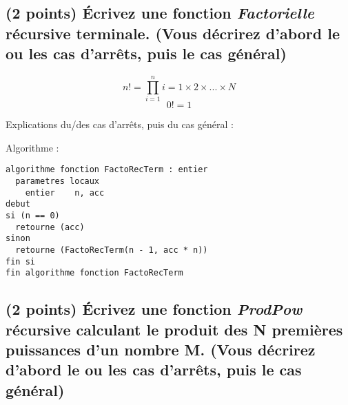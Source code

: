 \documentclass[11pt,a4paper]{article}
\begin{document}
\subsection{(2 points) \'Ecrivez une fonction \og \textit{Factorielle} \fg{} récursive terminale. (Vous décrirez d'abord le ou les cas d'arrêts, puis le cas général) }

\vspace*{-0.5cm}

\begin{center}

\begin{equation*}
n! = \prod^{n}_{i = 1} i = 1 \times 2 \times ... \times N
\end{equation*}
%
\vspace*{-0.5cm}
%
\begin{equation*}
0! = 1
\end{equation*}

Explications du/des cas d'arrêts, puis du cas général :

\bigskip

Algorithme :

\begin{lstlisting}[style=algorithmique]
algorithme fonction FactoRecTerm : entier
  parametres locaux
    entier    n, acc
debut
si (n == 0)
  retourne (acc)
sinon
  retourne (FactoRecTerm(n - 1, acc * n))
fin si
fin algorithme fonction FactoRecTerm \end{lstlisting}

\end{center}


\clearpage


\subsection{(2 points) \'Ecrivez une fonction \og \textit{ProdPow} \fg{} récursive calculant le produit des N premières puissances d'un nombre M. (Vous décrirez d'abord le ou les cas d'arrêts, puis le cas général) }

\vspace*{-0.5cm}
\end{document}
